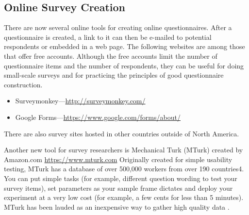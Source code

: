 \subsection{Online Survey Creation}

There are now several online tools for creating online questionnaires. After a questionnaire is created, a link to it can then be e-mailed to potential respondents or embedded in a web page. The following websites are among those that offer free accounts. Although the free accounts limit the number of questionnaire items and the number of respondents, they can be useful for doing small-scale surveys and for practicing the principles of good questionnaire construction. 
\begin{itemize}
\item Surveymonkey---\url{http://surveymonkey.com/}
\item Google Forms---\url{https://www.google.com/forms/about/}
\end{itemize}

There are also survey sites hosted in other countries outside of North America.

Another new tool for survey researchers is Mechanical Turk (MTurk) created by Amazon.com
\url{https://www.mturk.com} Originally created for simple usability testing, MTurk has a database of over 500,000 workers from over 190 countries4. You can put simple tasks (for example, different question wording to test your survey items), set parameters as your sample frame dictates and deploy your experiment at a very low cost (for example, a few cents for less than 5 minutes). MTurk has been lauded as an inexpensive way to gather high quality data \citep{buhrmester_amazons_2011}.


\subsection{}

